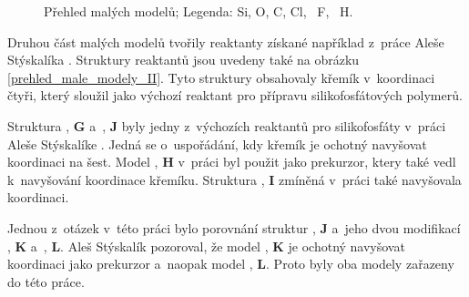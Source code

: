 \documentclass[
digital, %
table,   %
nolof,     %
nolot,     %
oneside,
]{fithesis3}
\begin{document}
\begin{figure}
\caption{Přehled malých modelů; Legenda:  Si,  O,  C,  Cl, ~F, ~H.}
\label{prehled_male_modely}
\end{figure}

Druhou část malých modelů tvořily reaktanty získané například z~práce Aleše Stýskalíka \cite{Styskalik2015thesis}. Struktury reaktantů jsou uvedeny také na obrázku \ref{prehled_male_modely_II}. Tyto struktury obsahovaly křemík v~koordinaci čtyři, který sloužil jako výchozí reaktant pro přípravu silikofosfátových polymerů.

 Struktura , \textbf{G} a~,  \textbf{J}  byly jedny z~výchozích reaktantů pro silikofosfáty v~práci Aleše Stýskalíke \cite{Styskalik2015thesis}. Jedná se o~uspořádání, kdy křemík je ochotný navyšovat koordinaci na šest. Model ,  \textbf{H} v~práci \cite{aksamentova2009synthesis} byl použit jako prekurzor, ktery také vedl k~navyšování koordinace křemíku. Struktura , \textbf{I} zmíněná v~práci \cite{Styskalik2015thesis} také navyšovala koordinaci.

 Jednou z~otázek v~této práci bylo porovnání struktur ,  \textbf{J} a~jeho dvou modifikací ,  \textbf{K} a~,  \textbf{L}. Aleš Stýskalík pozoroval, že model ,  \textbf{K} je ochotný navyšovat koordinaci jako prekurzor a~naopak model ,  \textbf{L}. Proto byly oba modely zařazeny do této práce.
\end{document}
